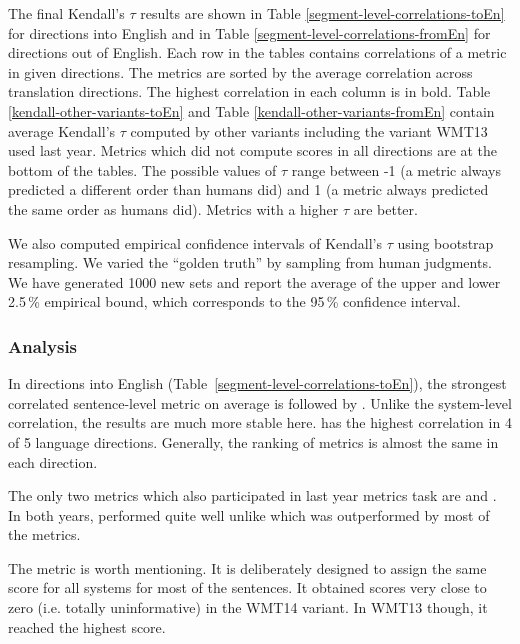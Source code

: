 \afterpage{\clearpage}




The final Kendall's $\tau$ results are shown in Table
\ref{segment-level-correlations-toEn} for directions into English and in Table
\ref{segment-level-correlations-fromEn} for directions out of English.  Each
row in the tables contains correlations of a metric in given directions. The
metrics are sorted by the average correlation across translation directions.  The
highest correlation in each column is in bold. Table
\ref{kendall-other-variants-toEn} and Table \ref{kendall-other-variants-fromEn}
contain average Kendall's $\tau$ computed by other variants including the
variant WMT13 used last year.  Metrics which did not compute scores in all
directions are at the bottom of the tables. The possible values of $\tau$ range
between -1 (a metric always predicted a different order than humans did) and 1
(a metric always predicted the same order as humans did). Metrics with a higher
$\tau$ are better.

We also computed empirical confidence intervals of Kendall's $\tau$ using bootstrap
resampling. We varied the ``golden truth'' by sampling from human judgments. We
have generated 1000 new sets and report the average of the upper and lower
2.5\,\% empirical bound, which corresponds to the 95\,\% confidence interval.

\subsubsection{Analysis}

In directions into English (Table~\ref{segment-level-correlations-toEn}), the
strongest correlated sentence-level metric on average is
 followed by . Unlike the system-level
correlation, the results are much more stable here.
 has the highest correlation in 4 of 5 language
directions. Generally, the ranking of metrics is almost the same in each
direction. 

The only two metrics which also participated in last year metrics task are
 and . In both years,  performed
quite well unlike  which was outperformed by most of the
metrics. 

The metric  is worth mentioning.  It is deliberately
designed to assign the same score for all systems for most of the sentences.  It
obtained scores very close to zero (i.e. totally uninformative) in the WMT14
variant.  In WMT13 though, it reached the highest score.

